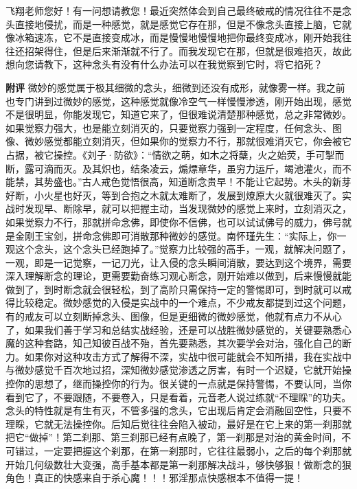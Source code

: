 \begin{case}
    飞翔老师您好！有一问想请教您！最近突然体会到自己最终破戒的情况往往不是念头直接地侵扰，而是一种感觉，就是感觉它存在那，但是不像念头直接上脑，它就像冰箱速冻，它不是直接变成冰，而是慢慢地慢慢地把你最终变成冰，刚开始我往往还招架得住，但是后来渐渐就不行了。而我发现它在那，但就是很难掐灭，故此想向您请教下，这种念头有没有什么办法可以在我觉察到它时，将它掐死？

    \textbf{附评} 微妙的感觉属于极其细微的念头，细微到还没有成形，就像雾一样。我之前也专门讲到过微妙的感觉，这种感觉就像冷空气一样慢慢渗透，刚开始出现，感觉不是很明显，你能发现它，知道它来了，但很难说清楚那种感觉，总之非常微妙。如果觉察力强大，也是能立刻消灭的，只要觉察力强到一定程度，任何念头、图像、微妙感觉都能立刻消灭，但如果你的觉察力不行，那就很难消灭它，你会被它占据，被它操控。《刘子·防欲》：“情欲之萌，如木之将蘖，火之始荧，手可掣而断，露可滴而灭。及其炽也，结条凌云，煽熛章华，虽穷力运斤，竭池灌火，而不能禁，其势盛也。”古人戒色觉悟很高，知道断念贵早！不能让它起势。木头的新芽好断，小火星也好灭，等到合抱之木就太难断了，发展到燎原大火就很难灭了。实战时发现早、断除早，就可以把握主动，当发现微妙的感觉上来时，立刻消灭之，如果觉察力不行，那就拼命念佛，即使你不信佛，也可以试试佛号的威力，佛号就是金刚王宝剑，拼命念佛即可消散那种微妙的感觉。南怀瑾先生：“实际上，你一观这个念头，这个念头已经跑掉了。”觉察力比较强的高手，一观，就解决问题了，一观，即是一记觉察，一记刀光，让入侵的念头瞬间消散，要达到这个境界，需要深入理解断念的理论，更需要勤奋练习观心断念，刚开始难以做到，后来慢慢就能做到了，到时断念就会很轻松，到了高阶只需保持一定的警惕即可，到时就可以戒得比较稳定。微妙感觉的入侵是实战中的一个难点，不少戒友都提到过这个问题，有的戒友可以立刻断掉念头、图像，但是更细微的微妙感觉，他就有点力不从心了，如果我们善于学习和总结实战经验，还是可以战胜微妙感觉的，关键要熟悉心魔的这种套路，知己知彼百战不殆，首先要熟悉，其次要学会对治，强化自己的断力。如果你对这种攻击方式了解得不深，实战中很可能就会不知所措，我在实战中与微妙感觉千百次地过招，深知微妙感觉渗透之厉害，有时一个迟疑，它就开始操控你的思想了，继而操控你的行为。很关键的一点就是保持警惕，不要认同，当你看到它了，不要跟随，不要卷入，只是看着，元音老人说过练就“不理睬”的功夫。念头的特性就是有生有灭，不管多强的念头，它出现后肯定会消融回空性，只要不理睬，它就无法操控你。后知后觉往往会陷入被动，最好是在它上来的第一刹那就把它“做掉”！第二刹那、第三刹那已经有点晚了，第一刹那是对治的黄金时间，不可错过，一定要把握这个刹那，在第一刹那时，它往往最弱小，之后的每个刹那就开始几何级数壮大变强，高手基本都是第一刹那解决战斗，够快够狠！做断念的狠角色！真正的快感来自于杀心魔！！！邪淫那点快感根本不值得一提！
\end{case}

